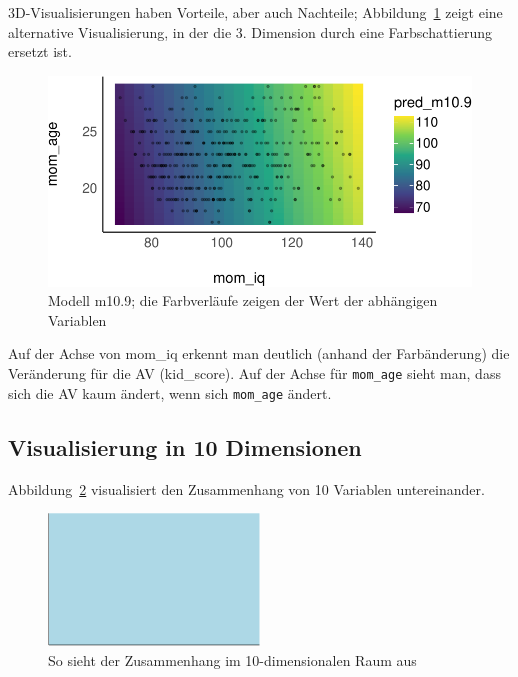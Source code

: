 \documentclass[
  a4paper,
  DIV=11]{scrreprt}
\theoremstyle{definition}
\theoremstyle{remark}
\begin{document}
3D-Visualisierungen haben Vorteile, aber auch Nachteile;
Abbildung~\ref{fig-m109-color} zeigt eine alternative Visualisierung, in
der die 3. Dimension durch eine Farbschattierung ersetzt ist.

\begin{figure}

{\centering \includegraphics{./metrische-AV_files/figure-pdf/fig-m109-color-1.pdf}

}

\caption{\label{fig-m109-color}Modell m10.9; die Farbverläufe zeigen der
Wert der abhängigen Variablen}

\end{figure}

Auf der Achse von mom\_iq erkennt man deutlich (anhand der Farbänderung)
die Veränderung für die AV (kid\_score). Auf der Achse für
\texttt{mom\_age} sieht man, dass sich die AV kaum ändert, wenn sich
\texttt{mom\_age} ändert.

\hypertarget{visualisierung-in-10-dimensionen}{%
\subsection{Visualisierung in 10
Dimensionen}\label{visualisierung-in-10-dimensionen}}

Abbildung~\ref{fig-ten-dims} visualisiert den Zusammenhang von 10
Variablen untereinander.

\begin{figure}

{\centering \includegraphics[width=0.5\textwidth,height=\textheight]{./metrische-AV_files/figure-pdf/fig-ten-dims-1.pdf}

}

\caption{\label{fig-ten-dims}So sieht der Zusammenhang im
10-dimensionalen Raum aus}

\end{figure}
\end{document}
